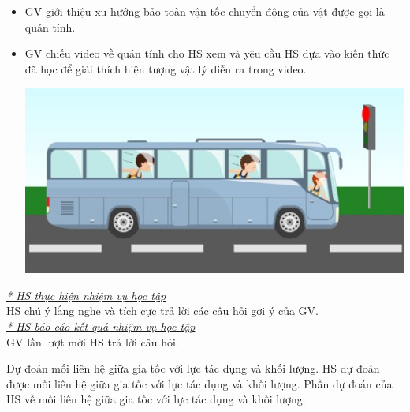 {\begin{itemize}[label=-]
			\item GV giới thiệu xu hướng bảo toàn vận tốc chuyển động của vật được gọi là quán tính.
			\item GV chiếu video về quán tính cho HS xem và yêu cầu HS dựa vào kiến thức đã học để giải thích hiện tượng vật lý diễn ra trong video.
			\begin{center}
				\includegraphics[scale=0.6]{figs/G10-BAI10-4}
			\end{center}
	\end{itemize}
\textit{\underline{* HS thực hiện nhiệm vụ học tập}}\\
HS chú ý lắng nghe và tích cực trả lời các câu hỏi gợi ý của GV.\\
\textit{\underline{* HS báo cáo kết quả nhiệm vụ học tập}}\\
GV lần lượt mời HS trả lời câu hỏi.
}
\hoatdong
{Dự đoán mối liên hệ giữa gia tốc với lực tác dụng và khối lượng.
}
{HS dự đoán được mối liên hệ giữa gia tốc với lực tác dụng và khối lượng.
}
{Phần dự đoán của HS về mối liên hệ giữa gia tốc với lực tác dụng và khối lượng.
}
